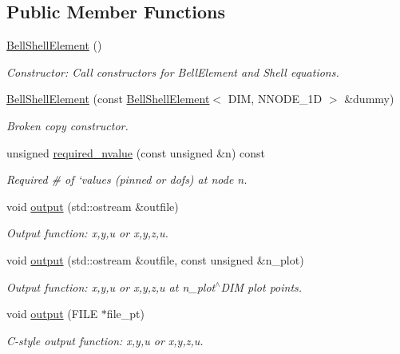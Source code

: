 \subsection*{Public Member Functions}
\begin{DoxyCompactItemize}
\item 
\hyperlink{classoomph_1_1BellShellElement_a9c8946b0c97fc993db62acafc76301d8}{Bell\+Shell\+Element} ()
\begin{DoxyCompactList}\small\item\em Constructor\+: Call constructors for Bell\+Element and Shell equations. \end{DoxyCompactList}\item 
\hyperlink{classoomph_1_1BellShellElement_a9a3476e77088236068b559a7021a899d}{Bell\+Shell\+Element} (const \hyperlink{classoomph_1_1BellShellElement}{Bell\+Shell\+Element}$<$ D\+IM, N\+N\+O\+D\+E\+\_\+1D $>$ \&dummy)
\begin{DoxyCompactList}\small\item\em Broken copy constructor. \end{DoxyCompactList}\item 
unsigned \hyperlink{classoomph_1_1BellShellElement_aea6c22273ebe4a34111846313716fb0f}{required\+\_\+nvalue} (const unsigned \&n) const
\begin{DoxyCompactList}\small\item\em Required \# of `values\textquotesingle{} (pinned or dofs) at node n. \end{DoxyCompactList}\item 
void \hyperlink{classoomph_1_1BellShellElement_aebeebfbb5296217e3b6492392df3aeb5}{output} (std\+::ostream \&outfile)
\begin{DoxyCompactList}\small\item\em Output function\+: x,y,u or x,y,z,u. \end{DoxyCompactList}\item 
void \hyperlink{classoomph_1_1BellShellElement_a3bd16bf3ed27512990a593f8af97826d}{output} (std\+::ostream \&outfile, const unsigned \&n\+\_\+plot)
\begin{DoxyCompactList}\small\item\em Output function\+: x,y,u or x,y,z,u at n\+\_\+plot$^\wedge$\+D\+IM plot points. \end{DoxyCompactList}\item 
void \hyperlink{classoomph_1_1BellShellElement_a9abec4ec4338f67f88fcda4ff143e972}{output} (F\+I\+LE $\ast$file\+\_\+pt)
\begin{DoxyCompactList}\small\item\em C-\/style output function\+: x,y,u or x,y,z,u. \end{DoxyCompactList}\item 

\end{DoxyCompactItemize}
